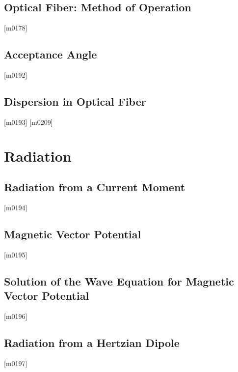 \documentclass[10pt,letterpaper,twocolumn,openany]{book}
\theoremstyle{definition} %
\begin{document}
    \section{Optical Fiber: Method of Operation}
{\color{blue}\tiny[m0178]}      
      \vfill\break
    \section{Acceptance Angle}
{\color{blue}\tiny[m0192]}      
      \vfill\break
    \section{Dispersion in Optical Fiber}
{\color{blue}\tiny[m0193]}      
{\color{blue}\tiny[m0209]}    
  \chapter{Radiation}
  \thispagestyle{fancy} %
  \fancyhf{}            %
    \section{Radiation from a Current Moment}
{\color{blue}\tiny[m0194]}      
      \vfill\break
    \section{Magnetic Vector Potential}
{\color{blue}\tiny[m0195]}      
      \vfill\break
    \section{Solution of the Wave Equation for Magnetic Vector Potential}
{\color{blue}\tiny[m0196]}      
      \vfill\break
    \section{Radiation from a Hertzian Dipole}
{\color{blue}\tiny[m0197]}      
      \vfill\break
\end{document}
